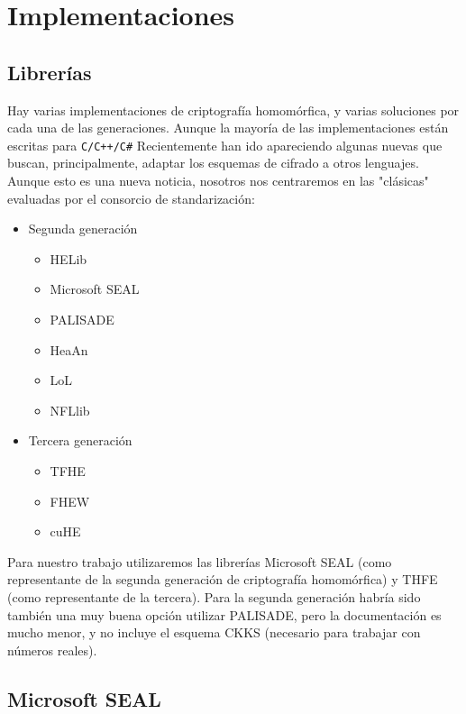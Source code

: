 \chapter{Implementaciones}
\label{chap:libs}

\section{Librerías}

Hay varias implementaciones de criptografía homomórfica, y varias soluciones por cada una de las generaciones. Aunque la mayoría de las implementaciones están escritas para \verb|C/C++/C#| Recientemente han ido apareciendo algunas nuevas que buscan, principalmente, adaptar los esquemas de cifrado a otros lenguajes. Aunque esto es una nueva noticia, nosotros nos centraremos en las "clásicas" evaluadas por el consorcio de standarización:

\begin{itemize}
    \item Segunda generación
    \begin{itemize}
        \item HELib
        \item Microsoft SEAL
        \item PALISADE
        \item HeaAn
        \item LoL
        \item NFLlib
    \end{itemize}
    \item Tercera generación
    \begin{itemize}
        \item TFHE
        \item FHEW
        \item cuHE
    \end{itemize}
\end{itemize}

Para nuestro trabajo utilizaremos las librerías Microsoft SEAL (como representante de la segunda generación de criptografía homomórfica) y THFE (como representante de la tercera). Para la segunda generación habría sido también una muy buena opción utilizar PALISADE, pero la documentación es mucho menor, y no incluye el esquema CKKS (necesario para trabajar con números reales).

\section{Microsoft SEAL}
\label{tag:msfseal}

